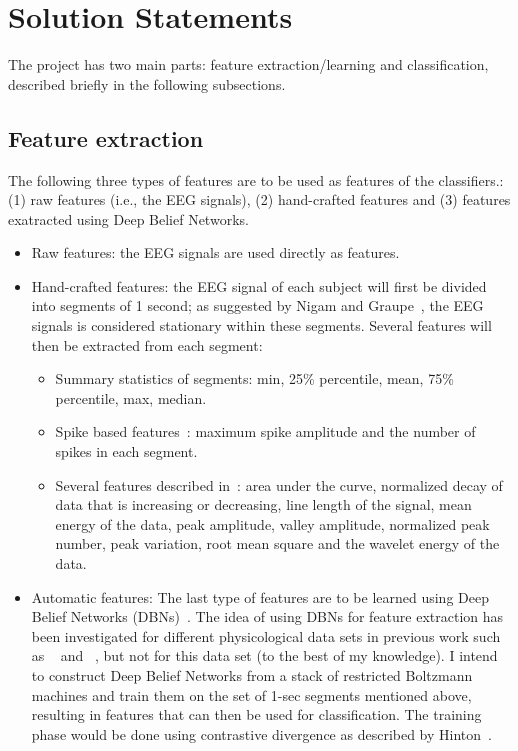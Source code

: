 \documentclass[12pt]{article}
\begin{document}
\section{Solution Statements}

The project has two main parts: feature extraction/learning and classification, described briefly in the following subsections.

\subsection{Feature extraction}
The following three types of features are to be used as features of the classifiers.: (1) raw features (i.e., the EEG signals), (2) hand-crafted features and (3) features exatracted using Deep Belief Networks.

\begin{itemize}

\item Raw features: the EEG signals are used directly as features.

\item Hand-crafted features: the EEG signal of each subject will first be divided into segments of 1 second; as suggested by Nigam and Graupe~\cite{nigam2004neural}, the EEG signals is considered stationary within these segments. Several features will then be extracted from each segment:
      \begin{itemize}
      \item Summary statistics of segments: min, 25\% percentile, mean, 75\% percentile, max, median.
      \item Spike based features~\cite{nigam2004neural}: maximum spike amplitude and the number of spikes in each segment.
      \item Several features described in~\cite{wulsin2011modeling}: area under the curve, normalized decay of data that is increasing or decreasing, line length of the signal, mean energy of the data, peak amplitude, valley amplitude, normalized peak number, peak variation, root mean square and the wavelet energy of the data.
      \end{itemize}

\item Automatic features: The last type of features are to be learned using Deep Belief Networks (DBNs)~\cite{hinton2006reducing}. The idea of using DBNs for feature extraction has been investigated for different physicological data sets in previous work such as ~\cite{langkvist2012sleep} and ~\cite{wulsin2011modeling}, but not for this data set (to the best of my knowledge). I intend to construct Deep Belief Networks from a stack of restricted Boltzmann machines and train them on the set of 1-sec segments mentioned above, resulting in features that can then be used for classification. The training phase would be done using contrastive divergence as described by Hinton~\cite{hinton2006training}.

\end{itemize}
\end{document}

